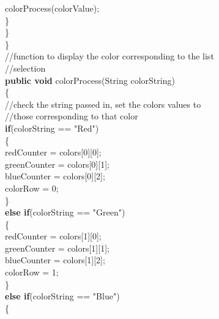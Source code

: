 \documentclass[12pt]{article}
\begin{document}
\begin{flushleft}
{\qquad \qquad \qquad \qquad \qquad \qquad	colorProcess(colorValue);\\                                
\qquad \qquad \qquad \qquad \qquad 		\}\\
\qquad \qquad \qquad \qquad		\}\\    
\qquad \qquad \qquad	\}\\
			[2mm]
\qquad \qquad \qquad	//function to display the color corresponding to the list\\
\qquad \qquad \qquad //selection\\
\qquad \qquad \qquad	\textbf{public void} colorProcess(String colorString)\\
\qquad \qquad \qquad	\{\\
				[2mm]
\qquad \qquad \qquad \qquad		//check the string passed in, set the colors values to\\
\qquad \qquad \qquad \qquad	 //those corresponding to that color\\ 
\qquad \qquad \qquad \qquad	\textbf{if}(colorString == "Red")\\
\qquad \qquad \qquad \qquad	\{\\
\qquad \qquad \qquad \qquad \qquad		redCounter = colors[0][0];\\ 
\qquad \qquad \qquad \qquad \qquad	greenCounter = colors[0][1];\\
\qquad \qquad \qquad \qquad \qquad	blueCounter = colors[0][2];\\   
\qquad \qquad \qquad \qquad \qquad		colorRow = 0;\\             
\qquad \qquad \qquad \qquad \qquad	\}\\  
\qquad \qquad \qquad \qquad \qquad	\textbf{else if}(colorString == "Green")\\
\qquad \qquad \qquad \qquad \qquad	\{\\
\qquad \qquad \qquad \qquad \qquad \qquad	redCounter = colors[1][0];\\ 
\qquad \qquad \qquad \qquad \qquad \qquad					greenCounter = colors[1][1];\\
\qquad \qquad \qquad \qquad \qquad \qquad					blueCounter = colors[1][2];\\
\qquad \qquad \qquad \qquad \qquad \qquad					colorRow = 1;\\    
\qquad \qquad \qquad \qquad \qquad	\}\\
\qquad \qquad \qquad \qquad \qquad	\textbf{else if}(colorString == "Blue")\\
\qquad \qquad \qquad \qquad \qquad	\{\\
}
\end{flushleft}
\end{document}
